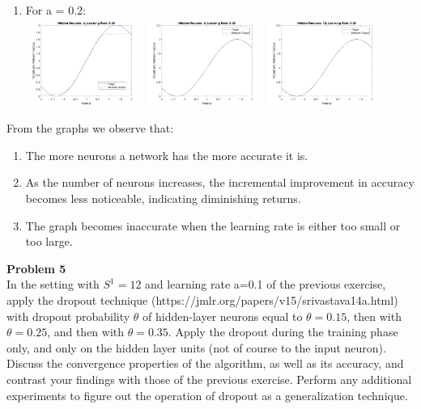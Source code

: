 \documentclass{article}
\begin{document}
\begin{enumerate}
  \item For a = 0.2: \\
  \includegraphics[width=0.3\textwidth]{Problem4_2_0.2.png}
  \includegraphics[width=0.3\textwidth]{Problem4_8_0.2.png}
  \includegraphics[width=0.3\textwidth]{Problem4_12_0.2.png}
\end{enumerate}

\noindent From the graphs we observe that:
\begin{enumerate}
  \item The more neurons a network has the more accurate it is.
  \item 
  As the number of neurons increases, the incremental improvement in accuracy becomes less noticeable, indicating diminishing returns.
  \item The graph becomes inaccurate when the learning rate is either too small or too large.
\end{enumerate}

\newpage
\noindent \textbf{Problem 5} \\

\noindent In the setting with $S^1= 12$ and learning rate a=0.1 of the previous exercise, apply the
dropout technique (https://jmlr.org/papers/v15/srivastava14a.html) with dropout
probability $\theta$ of hidden-layer neurons equal to $\theta=0.15$, then with $\theta=0.25$, and then with
$\theta=0.35$. Apply the dropout during the training phase only, and only on the hidden layer
units (not of course to the input neuron). Discuss the convergence properties of the
algorithm, as well as its accuracy, and contrast your findings with those of the previous
exercise. Perform any additional experiments to figure out the operation of dropout as a
generalization technique. \\ \\ \\
\end{document}
